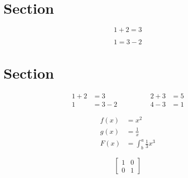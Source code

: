 \documentclass{article}
\begin{document}
\tableofcontents
\newpage

\section{Section}

\begin{equation*}
  1 + 2 = 3
\end{equation*}

\begin{equation*}
  1 = 3 - 2
\end{equation*}

\newpage

\section{Section}

\begin{align*}
  1 + 2 &= 3\qquad\qquad  &2+3 & = 5 \\
  1 &= 3 - 2 \qquad\qquad &4-3 & = 1
\end{align*}

\begin{align*}
  f(x) &= x^2\\
  g(x) &= \frac{1}{x}\\
  F(x) &= \int^a_b \frac{1}{3}x^3
\end{align*}

\begin{equation}
\left[
\begin{matrix}
1 & 0\\
0 & 1
\end{matrix}
\right]
\end{equation}
\end{document}
